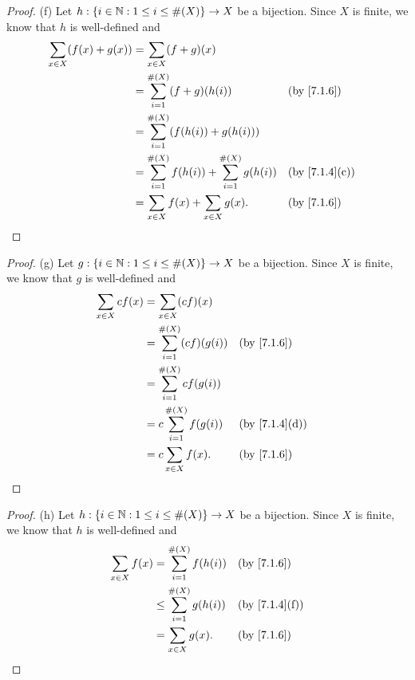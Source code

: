 \begin{proof}{(f)}
  Let \(h : \left\lbrace i \in \mathbb{N} : 1 \leq i \leq \#(X)\right\rbrace \to X\) be a bijection.
  Since \(X\) is finite, we know that \(h\) is well-defined and
  \begin{align*}
    \sum_{x \in X} (f(x) + g(x)) & = \sum_{x \in X} (f + g)(x)                                                                    \\
                                 & = \sum_{i = 1}^{\#(X)} (f + g)(h(i))                          &  & \by{7.1.6}                  \\
                                 & = \sum_{i = 1}^{\#(X)} (f(h(i)) + g(h(i)))                                                     \\
                                 & = \sum_{i = 1}^{\#(X)} f(h(i)) + \sum_{i = 1}^{\#(X)} g(h(i)) &  & \text{(by \cref{7.1.4}(c))} \\
                                 & = \sum_{x \in X} f(x) + \sum_{x \in X} g(x).                  &  & \by{7.1.6}
  \end{align*}
\end{proof}

\begin{proof}{(g)}
  Let \(g : \left\lbrace i \in \mathbb{N} : 1 \leq i \leq \#(X)\right\rbrace \to X\) be a bijection.
  Since \(X\) is finite, we know that \(g\) is well-defined and
  \begin{align*}
    \sum_{x \in X} cf(x) & = \sum_{x \in X} (cf)(x)                                           \\
                         & = \sum_{i = 1}^{\#(X)} (cf)(g(i)) &  & \by{7.1.6}                  \\
                         & = \sum_{i = 1}^{\#(X)} cf(g(i))                                    \\
                         & = c \sum_{i = 1}^{\#(X)} f(g(i))  &  & \text{(by \cref{7.1.4}(d))} \\
                         & = c \sum_{x \in X} f(x).          &  & \by{7.1.6}
  \end{align*}
\end{proof}

\begin{proof}{(h)}
  Let \(h : \left\lbrace i \in \mathbb{N} : 1 \leq i \leq \#(X)\right\rbrace \to X\) be a bijection.
  Since \(X\) is finite, we know that \(h\) is well-defined and
  \begin{align*}
    \sum_{x \in X} f(x) & = \sum_{i = 1}^{\#(X)} f(h(i))    &  & \by{7.1.6}                  \\
                        & \leq \sum_{i = 1}^{\#(X)} g(h(i)) &  & \text{(by \cref{7.1.4}(f))} \\
                        & = \sum_{x \in X} g(x).            &  & \by{7.1.6}
  \end{align*}
\end{proof}


